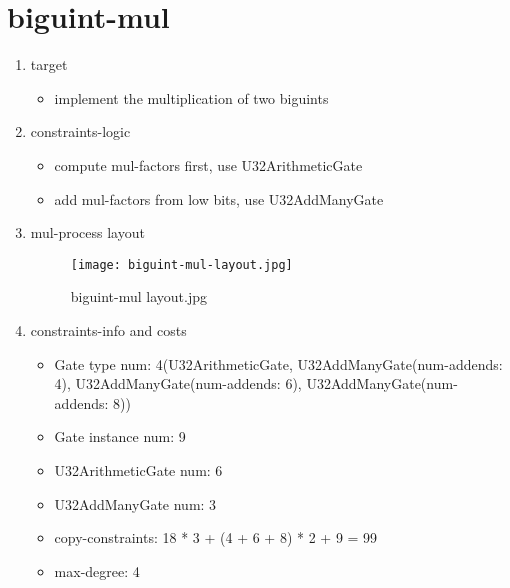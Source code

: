 \section{biguint-mul}
\label{biguint-mul}

\begin{enumerate}
    \item target
        \begin{itemize}
            \item implement the multiplication of two biguints
        \end{itemize}
    \item constraints-logic
        \begin{itemize}
            \item compute mul-factors first, use U32ArithmeticGate
            \item add mul-factors from low bits, use U32AddManyGate
        \end{itemize}
    \item mul-process layout
        \begin{figure}[!ht]
            \centering
            \texttt{[image: biguint-mul-layout.jpg]}
            \caption{biguint-mul layout.jpg}
            \label{fig:biguint-mul-layout.jpg}
        \end{figure}
    
    \item constraints-info and costs
        \begin{itemize}
            \item Gate type num: 4(U32ArithmeticGate, U32AddManyGate(num-addends: 4), U32AddManyGate(num-addends: 6), U32AddManyGate(num-addends: 8))
            \item Gate instance num: 9
            \item U32ArithmeticGate num: 6
            \item U32AddManyGate num: 3
            \item copy-constraints: 18 * 3 + (4 + 6 + 8) * 2 + 9 = 99
            \item max-degree: 4
        \end{itemize}

\end{enumerate}